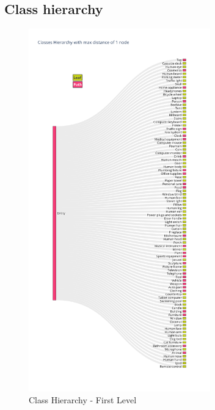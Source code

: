 \documentclass[11pt, a4paper, onecolumn]{article}
\begin{document}
\begin{appendices}
	\section {Class hierarchy}
	\label{sec:appendix-a}
	
	\begin{figure}[!ht]
		\centering
		\includegraphics[width=0.7\textwidth]{lvl1_classes.png}
		\caption{\scriptsize Class Hierarchy - First Level}
	\end{figure}
	

\end{appendices}
\end{document}
